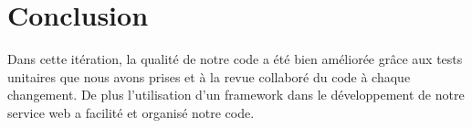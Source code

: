 \section*{Conclusion}

Dans cette itération, la qualité de notre code a été bien améliorée grâce aux
tests unitaires que nous avons prises et à la revue collaboré du code à chaque
changement. De plus l'utilisation d'un framework dans le développement de notre
service web a facilité et organisé notre code.
